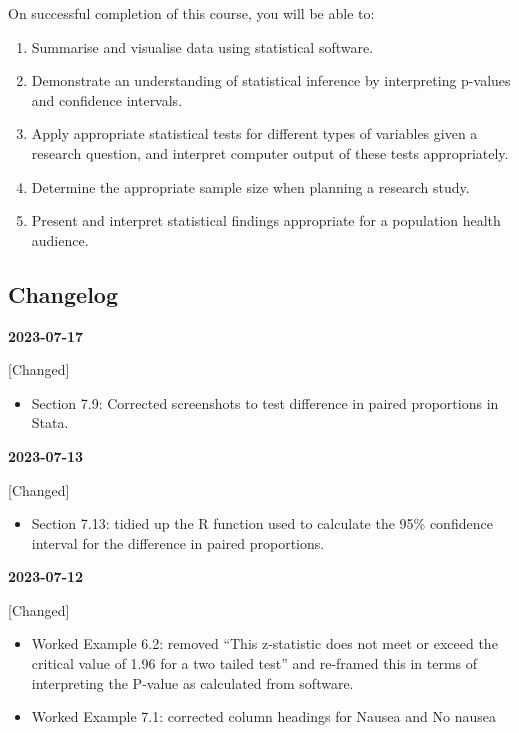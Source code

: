 \documentclass[
  a4paper,
]{memoir}
\providecommand{\tightlist}{%
  \setlength{\itemsep}{0pt}\setlength{\parskip}{0pt}}\usepackage{longtable,booktabs,array}
\begin{document}

On successful completion of this course, you will be able to:

\begin{enumerate}
\def\labelenumi{\arabic{enumi}.}
\tightlist
\item
  Summarise and visualise data using statistical software.
\item
  Demonstrate an understanding of statistical inference by interpreting
  p-values and confidence intervals.
\item
  Apply appropriate statistical tests for different types of variables
  given a research question, and interpret computer output of these
  tests appropriately.
\item
  Determine the appropriate sample size when planning a research study.
\item
  Present and interpret statistical findings appropriate for a
  population health audience.
\end{enumerate}

\hypertarget{changelog}{%
\subsection*{Changelog}\label{changelog}}

\textbf{2023-07-17}

{[}Changed{]}

\begin{itemize}
\tightlist
\item
  Section 7.9: Corrected screenshots to test difference in paired
  proportions in Stata.
\end{itemize}

\textbf{2023-07-13}

{[}Changed{]}

\begin{itemize}
\tightlist
\item
  Section 7.13: tidied up the R function used to calculate the 95\%
  confidence interval for the difference in paired proportions.
\end{itemize}

\textbf{2023-07-12}

{[}Changed{]}

\begin{itemize}
\tightlist
\item
  Worked Example 6.2: removed ``This z-statistic does not meet or exceed
  the critical value of 1.96 for a two tailed test'' and re-framed this
  in terms of interpreting the P-value as calculated from software.
\item
  Worked Example 7.1: corrected column headings for Nausea and No nausea
\end{itemize}
\end{document}
